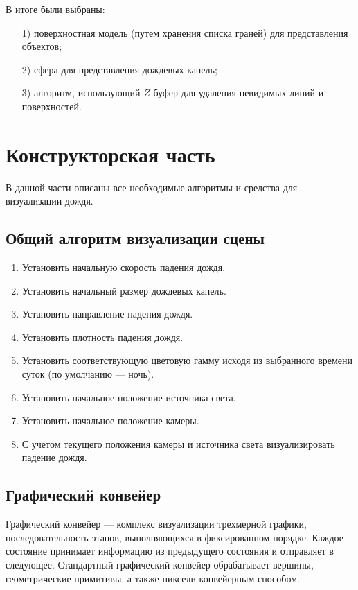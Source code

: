 В итоге были выбраны:

\begin{enumerate}
\item[1)]
поверхностная модель (путем хранения списка граней) для представления объектов;
\item[2)]
сфера для представления дождевых капель;
\item[3)]
алгоритм, использующий $Z$-буфер для удаления невидимых линий и поверхностей.
\end{enumerate}

\chapter{Конструкторская часть}

В данной части описаны все необходимые алгоритмы и средства для визуализации дождя.

\section{Общий алгоритм визуализации сцены}

\begin{enumerate}
\item
Установить начальную скорость падения дождя.
\item
Установить начальный размер дождевых капель.
\item
Установить направление падения дождя.
\item
Установить плотность падения дождя.
\item
Установить соответствующую цветовую гамму исходя из выбранного времени суток (по умолчанию --- ночь).
\item
Установить начальное положение источника света.
\item
Установить начальное положение камеры.
\item
С учетом текущего положения камеры и источника света визуализировать падение дождя.
\end{enumerate}

\section{Графический конвейер}

Графический конвейер --- комплекс визуализации трехмерной графики, последовательность этапов, выполняющихся в фиксированном порядке. 
Каждое состояние принимает информацию из предыдущего состояния и отправляет в следующее. 
Стандартный графический конвейер обрабатывает вершины, геометрические примитивы, а также пиксели конвейерным способом.

